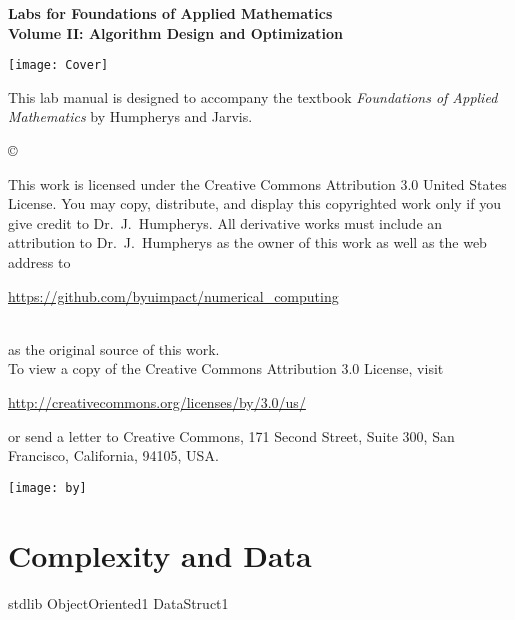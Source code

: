 \documentclass[nociteref]{SIAM-GH-book}
\begin{document}
\thispagestyle{empty}

\begin{center}
{\huge \bf Labs for Foundations of Applied Mathematics} \\
\vspace{5mm}
{\Large \bf Volume II: Algorithm
Design and Optimization}
\vspace{20mm}

\texttt{[image: Cover]}
\end{center}
\frontmatter




\begin{thepreface}
This lab manual is designed to accompany the textbook \emph{Foundations of Applied Mathematics} by Humpherys and Jarvis.

\vfill
\copyright{This work is licensed under the Creative Commons Attribution 3.0 United States
License.  You may copy, distribute, and display this copyrighted work only if you give
credit to Dr.~J.~Humpherys. All derivative works must include an attribution to Dr.~J.~Humpherys as the owner of this work as well as the web address to
\\\centerline{\url{https://github.com/byuimpact/numerical_computing}}\\ as the original source of
this
work.\\To view a copy of the Creative Commons Attribution 3.0 License,
visit\\\centerline{\url{http://creativecommons.org/licenses/by/3.0/us/}} or send a letter to
Creative Commons, 171 Second Street, Suite 300, San Francisco, California, 94105, USA.}

\vfill
\centering\texttt{[image: by]}
\vfill
\end{thepreface}

\setcounter{tocdepth}{1}
\tableofcontents

\mainmatter

\part{Complexity and Data}
{stdlib}
{ObjectOriented1}
{DataStruct1}
\end{document}
